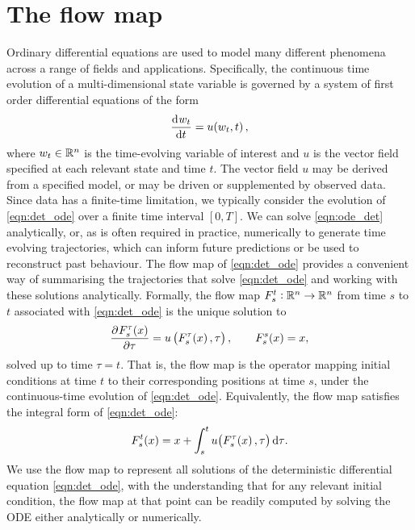 \section{The flow map}
Ordinary differential equations are used to model many different phenomena across a range of fields and applications.
Specifically, the continuous time evolution of a multi-dimensional state variable is governed by a system of first order differential equations of the form
\begin{equation}\label{eqn:det_ode}
	\dod{w_t}{t} = u\!\left(w_t, t\right),
\end{equation}
where \(w_t \in \mathbb{R}^n\) is the time-evolving variable of interest and \(u\) is the vector field specified at each relevant state and time \(t\).
The vector field \(u\) may be derived from a specified model, or may be driven or supplemented by observed data.
Since data has a finite-time limitation, we typically consider the evolution of \cref{eqn:det_ode} over a finite time interval \([0,T]\).
We can solve \cref{eqn:ode_det} analytically, or, as is often required in practice, numerically to generate time evolving trajectories, which can inform future predictions or be used to reconstruct past behaviour.
The flow map of \cref{eqn:det_ode} provides a convenient way of summarising the trajectories that solve \cref{eqn:det_ode} and working with these solutions analytically.
Formally, the flow map \(F_{s}^{t}: \mathbb{R}^n \to \mathbb{R}^n\) from time \(s\) to \(t\) associated with \cref{eqn:det_ode} is the unique solution to
\begin{equation}
	\dpd{F_{s}^{\tau}\!\left(x\right)}{\tau} = u\left(F_{s}^\tau\!\left(x\right), \tau\right), \qquad F_{s}^{s}\!\left(x\right) = x,
	\label{eqn:flow_map_ode}
\end{equation}
solved up to time \(\tau = t\).
That is, the flow map is the operator mapping initial conditions at time \(t\) to their corresponding positions at time \(s\), under the continuous-time evolution of \cref{eqn:det_ode}.
Equivalently, the flow map satisfies the integral form of \cref{eqn:det_ode}:
\begin{equation*}
	F_s^t\!\left(x\right) = x + \int_s^t{u\!\left(F_s^{\tau}\!\left(x\right), \tau\right)\dif \tau}.
\end{equation*}
We use the flow map to represent all solutions of the deterministic differential equation \cref{eqn:det_ode}, with the understanding that for any relevant initial condition, the flow map at that point can be readily computed by solving the ODE either analytically or numerically.
